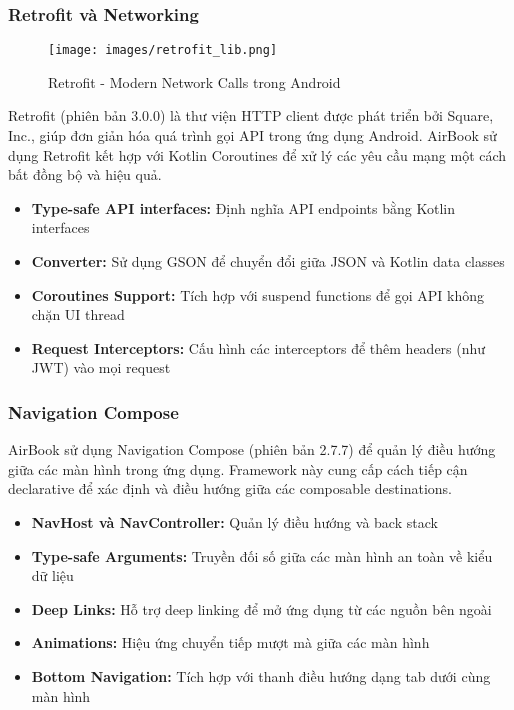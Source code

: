 \subsubsection{Retrofit và Networking}

\begin{figure}[H]
\centering
\texttt{[image: images/retrofit\_lib.png]}
\caption{Retrofit - Modern Network Calls trong Android}
\end{figure}

Retrofit (phiên bản 3.0.0) là thư viện HTTP client được phát triển bởi Square, Inc., giúp đơn giản hóa quá trình gọi API trong ứng dụng Android. AirBook sử dụng Retrofit kết hợp với Kotlin Coroutines để xử lý các yêu cầu mạng một cách bất đồng bộ và hiệu quả.

\begin{itemize}[leftmargin=1cm]
    \item \textbf{Type-safe API interfaces:} Định nghĩa API endpoints bằng Kotlin interfaces
    \item \textbf{Converter:} Sử dụng GSON để chuyển đổi giữa JSON và Kotlin data classes
    \item \textbf{Coroutines Support:} Tích hợp với suspend functions để gọi API không chặn UI thread
    \item \textbf{Request Interceptors:} Cấu hình các interceptors để thêm headers (như JWT) vào mọi request
\end{itemize}

\subsubsection{Navigation Compose}

AirBook sử dụng Navigation Compose (phiên bản 2.7.7) để quản lý điều hướng giữa các màn hình trong ứng dụng. Framework này cung cấp cách tiếp cận declarative để xác định và điều hướng giữa các composable destinations.

\begin{itemize}[leftmargin=1cm]
    \item \textbf{NavHost và NavController:} Quản lý điều hướng và back stack
    \item \textbf{Type-safe Arguments:} Truyền đối số giữa các màn hình an toàn về kiểu dữ liệu
    \item \textbf{Deep Links:} Hỗ trợ deep linking để mở ứng dụng từ các nguồn bên ngoài
    \item \textbf{Animations:} Hiệu ứng chuyển tiếp mượt mà giữa các màn hình
    \item \textbf{Bottom Navigation:} Tích hợp với thanh điều hướng dạng tab dưới cùng màn hình
\end{itemize}


